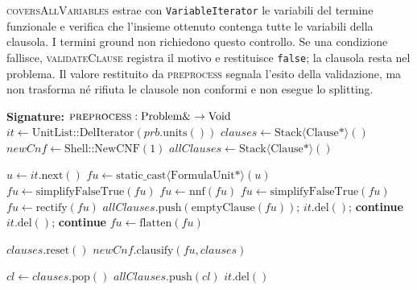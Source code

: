 \textsc{coversAllVariables} estrae con \texttt{VariableIterator} le variabili del termine funzionale e verifica che l'insieme ottenuto contenga tutte le variabili della clausola. I termini ground non richiedono questo controllo. Se una condizione fallisce, \textsc{validateClause} registra il motivo e restituisce \texttt{false}; la clausola resta nel problema. Il valore restituito da \textsc{preprocess} segnala l'esito della validazione, ma non trasforma né rifiuta le clausole non conformi e non esegue lo splitting.
\begin{algorithm}[H]
\caption{FO2 Preprocessing Main Pipeline}
\label{alg:fo2_preprocess}
\begin{algorithmic}[1]
    \Statex \textbf{Signature:} $\textsc{preprocess}: \text{Problem}\& \to \text{Void}$
        \State $it \leftarrow \text{UnitList::DelIterator}(prb.\text{units}())$
        \State $clauses \leftarrow \text{Stack}\langle\text{Clause}*\rangle()$
    \State $newCnf \leftarrow \text{Shell::NewCNF}(1)$
        \State $allClauses \leftarrow \text{Stack}\langle\text{Clause}*\rangle()$

            \State $u \leftarrow it.\text{next}()$
                \State $fu \leftarrow \text{static\_cast}\langle\text{FormulaUnit}*\rangle(u)$
                \State $fu \leftarrow \text{simplifyFalseTrue}(fu)$
                \State $fu \leftarrow \text{nnf}(fu)$
                \State $fu \leftarrow \text{simplifyFalseTrue}(fu)$
                \State $fu \leftarrow \text{rectify}(fu)$
                    \State $allClauses.\text{push}(\text{emptyClause}(fu))$; $it.\text{del}()$; \textbf{continue}
                \EndIf
                    \State $it.\text{del}()$; \textbf{continue}
                \EndIf
                \State $fu \leftarrow \text{flatten}(fu)$

                \State $clauses.\text{reset}()$
                \State $newCnf.\text{clausify}(fu, clauses)$

                    \State $cl \leftarrow clauses.\text{pop}()$
                    \State $allClauses.\text{push}(cl)$
                \EndWhile
                \State $it.\text{del}()$
            \EndIf
        \EndWhile


\end{algorithmic}
\end{algorithm}
